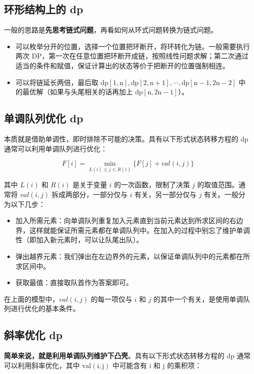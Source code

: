 \documentclass[UTF8]{article}
\begin{document}
\subsection{环形结构上的 dp}
一般的思路是\textbf{先思考链式问题}，再看如何从环式问题转换为链式问题。

\begin{itemize}
	\item 可以枚举分开的位置，选择一个位置把环断开，将环转化为链。一般需要执行两次 DP，第一次在任意位置把环断开成链，按照线性问题求解；第二次通过适当的条件和赋值，保证计算出的状态等价于把断开的位置强制相连。
	\item 可以将链延长两倍，最后取 $\mathrm{dp[1,n], dp[2 ,n + 1], \cdots, dp[n - 1, 2n - 2]}$ 中的最优解（如果与头尾相关的话再加上 $\mathrm{dp[n, 2n - 1]}$）。
\end{itemize}


\subsection{单调队列优化 dp}
本质就是借助单调性，即时排除不可能的决策。具有以下形式状态转移方程的 dp 通常可以利用单调队列进行优化：

$$
F[i] = \min\limits_{L(i) \le j \le R(i)} \{F[j] + val(i, j)\}
$$

其中 $L(i)$ 和 $R(i)$ 是关于变量 $i$ 的一次函数，限制了决策 $j$ 的取值范围。通常将 $val(i, j)$ 拆成两部分，一部分仅与 $i$ 有关，另一部分仅与 $j$ 有关。一般分为以下几步：

\begin{itemize}
	\item 加入所需元素：向单调队列重复加入元素直到当前元素达到所求区间的右边界，这样就能保证所需元素都在单调队列中。在加入的过程中别忘了维护单调性（即加入新元素时，可以让队尾出队）。
	\item 弹出越界元素：我们弹出在左边界外的元素，以保证单调队列中的元素都在所求区间中。
	\item 获取最值：直接取队首作为答案即可。
\end{itemize}

在上面的模型中，$val(i, j)$ 的每一项仅与 $i$ 和 $j$ 的其中一个有关，是使用单调队列进行优化的基本条件。


\subsection{斜率优化 dp}
\textbf{简单来说，就是利用单调队列维护下凸壳}。具有以下形式状态转移方程的 dp 通常可以利用斜率优化，其中 $\mathrm{val(i, j)}$ 中可能含有 $\mathrm{i}$ 和 $\mathrm{j}$ 的乘积项：
\end{document}
